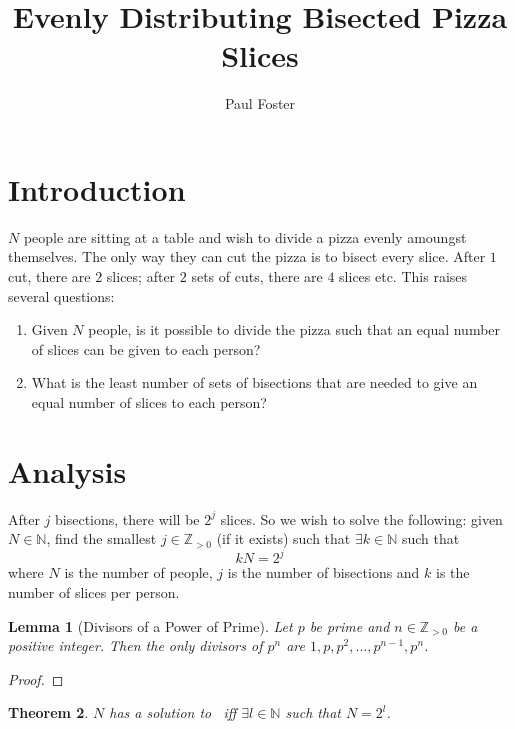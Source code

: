 \documentclass{article}
\title{Evenly Distributing Bisected Pizza Slices}
\author{Paul Foster}
\begin{document}
\maketitle

\newtheorem{theorem}{Theorem}
\newtheorem{corollary}{Corollary}[theorem]
\newtheorem{lemma}[theorem]{Lemma}

\section{Introduction}
$N$ people are sitting at a table and wish to divide a pizza evenly amoungst themselves. The only way they can cut the pizza is to bisect every slice. After $1$ cut, there are $2$ slices; after $2$ sets of cuts, there are $4$ slices etc. This raises several questions:
\begin{enumerate}
  \item Given $N$ people, is it possible to divide the pizza such that an equal number of slices can be given to each person?
  \item What is the least number of sets of bisections that are needed to give an equal number of slices to each person?
\end{enumerate}

\section{Analysis}
After $j$ bisections, there will be $2^j$ slices. So we wish to solve the following: given $N \in \mathbb{N}$, find the smallest $j \in \mathbb{Z}_{>0}$ (if it exists) such that $\exists k \in \mathbb{N}$ such that
\begin{equation} \label{eq:1}
  kN = 2^j
\end{equation}
where $N$ is the number of people, $j$ is the number of bisections and $k$ is the number of slices per person.

\begin{lemma}[Divisors of a Power of Prime] \label{lem:1}
Let $p$ be prime and $n \in \mathbb{Z}_{>0}$ be a positive integer. Then the only divisors of $p^n$ are $1, p, p^2, ..., p^{n-1}, p^n$.
\end{lemma}

\begin{proof}
\end{proof}

\begin{theorem} \label{the:1}
$N$ has a solution to~ iff $\exists l \in \mathbb{N}$ such that $N = 2^l$.
\end{theorem}
\end{document}
